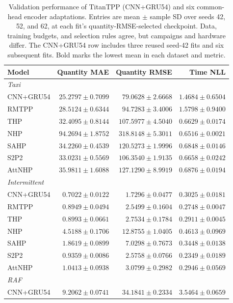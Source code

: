 \documentclass[runningheads]{llncs}
\begin{document}
\begin{table}[t]
\caption{Validation performance of TitanTPP (CNN+GRU54) and six common-head encoder adaptations. Entries are mean $\pm$ sample SD over seeds 42, 52, and 62, at each fit's quantity-RMSE-selected checkpoint. Data, training budgets, and selection rules agree, but campaigns and hardware differ. The CNN+GRU54 row includes three reused seed-42 fits and six subsequent fits. Bold marks the lowest mean in each dataset and metric.}
\label{tab:external-cnngru}
\centering\small
\setlength{\tabcolsep}{4pt}
\begin{tabular}{@{}lrrr@{}}
\toprule
Model & Quantity MAE & Quantity RMSE & Time NLL\\
\midrule
\multicolumn{4}{l}{\textit{Taxi}}\\
CNN+GRU54 & $\mathbf{25.2797\pm0.7099}$ & $\mathbf{79.0628\pm2.6668}$ & $1.4684\pm0.6504$\\
RMTPP & $28.5124\pm0.6344$ & $94.7283\pm3.4006$ & $1.5798\pm0.9400$\\
THP & $32.4095\pm0.8144$ & $107.5977\pm4.5040$ & $0.6629\pm0.0174$\\
NHP & $94.2694\pm1.8752$ & $318.8148\pm5.3011$ & $\mathbf{0.6516\pm0.0021}$\\
SAHP & $34.2260\pm0.4539$ & $120.5273\pm1.9996$ & $0.6848\pm0.0146$\\
S2P2 & $33.0231\pm0.5569$ & $106.3540\pm1.9135$ & $0.6658\pm0.0242$\\
AttNHP & $35.9811\pm1.6088$ & $127.1290\pm8.9919$ & $0.6876\pm0.0194$\\
\midrule
\multicolumn{4}{l}{\textit{Intermittent}}\\
CNN+GRU54 & $\mathbf{0.7022\pm0.0122}$ & $\mathbf{1.7296\pm0.0477}$ & $0.3025\pm0.0181$\\
RMTPP & $0.8949\pm0.0494$ & $2.5499\pm0.1604$ & $0.2748\pm0.0047$\\
THP & $0.8993\pm0.0661$ & $2.7534\pm0.1784$ & $0.2911\pm0.0045$\\
NHP & $4.5188\pm0.1706$ & $12.8755\pm1.0405$ & $0.4613\pm0.0969$\\
SAHP & $1.8619\pm0.0899$ & $7.0298\pm0.7673$ & $0.3448\pm0.0138$\\
S2P2 & $0.9359\pm0.0086$ & $2.5758\pm0.0766$ & $\mathbf{0.2349\pm0.0189}$\\
AttNHP & $1.0413\pm0.0938$ & $3.0799\pm0.2982$ & $0.2946\pm0.0569$\\
\midrule
\multicolumn{4}{l}{\textit{RAF}}\\
CNN+GRU54 & $9.2062\pm0.0741$ & $34.1841\pm0.2334$ & $3.5464\pm0.0659$\\

\end{tabular}
\end{table}
\end{document}
